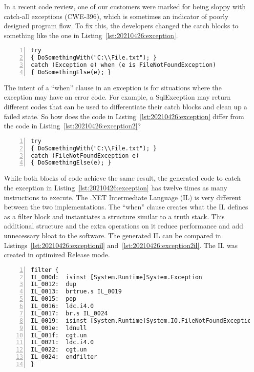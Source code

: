 In a recent code review, one of our customers were marked for being sloppy with catch-all exceptions (CWE-396), which is sometimes an indicator of poorly designed program flow. To fix this, the developers changed the catch blocks to something like the one in Listing~\ref{lst:20210426:exception}.

\begin{lstlisting}[caption={When-Conditioned Exception},captionpos=b,style=CSharpStyle,numbers=left,stepnumber=1,label={lst:20210426:exception}]
try
{ DoSomethingWith("C:\\File.txt"); }
catch (Exception e) when (e is FileNotFoundException)
{ DoSomethingElse(e); }
\end{lstlisting}

The intent of a ``when'' clause in an exception is for situations where the exception may have an error code. For example, a SqlException may return different codes that can be used to differentiate their catch blocks and clean up a failed state. So how does the code in Listing~\ref{lst:20210426:exception} differ from the code in Listing~\ref{lst:20210426:exception2}?

\begin{lstlisting}[caption={Classically-Conditioned Exception},captionpos=b,style=CSharpStyle,numbers=left,stepnumber=1,label={lst:20210426:exception2}]
try
{ DoSomethingWith("C:\\File.txt"); }
catch (FileNotFoundException e)
{ DoSomethingElse(e); }
\end{lstlisting}

While both blocks of code achieve the same result, the generated code to catch the exception in Listing~\ref{lst:20210426:exception} has twelve times as many instructions to execute. The .NET Intermediate Language (IL) is very different between the two implementations. The ``when'' clause creates what the IL defines as a filter block and instantiates a structure similar to a truth stack. This additional structure and the extra operations on it reduce performance and add unnecessary bloat to the software. The generated IL can be compared in Listings~\ref{lst:20210426:exceptionil} and~\ref{lst:20210426:exception2il}. The IL was created in optimized Release mode.

\begin{lstlisting}[caption={When-Conditioned Exception IL},captionpos=b,style=CSharpStyle,numbers=left,stepnumber=1,label={lst:20210426:exceptionil}]
filter {
IL_000d:  isinst [System.Runtime]System.Exception
IL_0012:  dup 
IL_0013:  brtrue.s IL_0019
IL_0015:  pop 
IL_0016:  ldc.i4.0 
IL_0017:  br.s IL_0024
IL_0019:  isinst [System.Runtime]System.IO.FileNotFoundException
IL_001e:  ldnull 
IL_001f:  cgt.un 
IL_0021:  ldc.i4.0 
IL_0022:  cgt.un 
IL_0024:  endfilter 
}
\end{lstlisting}


